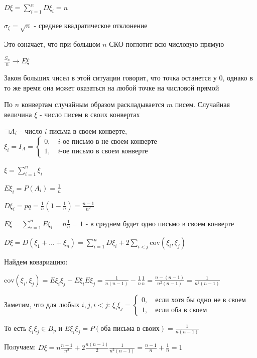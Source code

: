 \documentclass[12pt]{article}
\begin{document}
    $D\xi = \sum_{i = 1}^n D\xi_i = n$

    $\sigma_\xi = \sqrt{n}$ - среднее квадратическое отклонение

    Это означает, что при большом $n$ СКО поглотит всю числовую прямую

    $\frac{S_n}{n} \to E\xi$

    Закон больших чисел в этой ситуации говорит, что точка останется у 0, однако в то же время она может оказаться на любой точке на числовой прямой

    \Ex По $n$ конвертам случайным образом раскладывается $m$ писем. Случайная величина $\xi$ - число писем в своих конвертах

    $\mathord{\sqsupset} A_i$ - число $i$ письма в своем конверте, $\xi_i = I_A = \begin{cases}0, \quad i\text{-ое письмо в не своем конверте} \\ 1, \quad i\text{-ое письмо в своем конверте} \end{cases}$

    $\xi = \sum_{i = 1}^n \xi_i$

    $E\xi_i = P(A_i) = \frac{1}{n}$

    $D\xi_i = pq = \frac{1}{n} (1 - \frac{1}{n}) = \frac{n - 1}{n^2}$

    $E\xi = \sum_{i = 1}^n E\xi_i = n \frac{1}{n} = 1$ - в среднем будет одно письмо в своем конверте

    $D\xi = D(\xi_1 + \dots + \xi_n) = \sum_{i = 1}^n D\xi_i + 2\sum_{i < j} \mathrm{cov} (\xi_i, \xi_j)$

    Найдем ковариацию:

    $\mathrm{cov}(\xi_i, \xi_j) = E\xi_i \xi_j - E\xi_i E\xi_j = \frac{1}{n(n - 1)} - \frac{1}{n}\frac{1}{n} = \frac{n - (n - 1)}{n^2(n - 1)} = \frac{1}{n^2(n - 1)}$

    Заметим, что для любых $i, j, i < j$: $\xi_i \xi_j = \begin{cases}0, \quad \text{если хотя бы одно не в своем} \\ 1, \quad \text{если оба в своем}\end{cases}$
    
    То есть $\xi_i\xi_j \in B_p$ и $E\xi_i \xi_j = P(\text{оба письма в своих}) = \frac{1}{n(n - 1)}$

    Получаем: $D\xi = n \frac{n - 1}{n^2} + 2\frac{n(n - 1)}{2}\frac{1}{n^2(n - 1)} = \frac{n - 1}{n} + \frac{1}{n} = 1$

\end{document}
